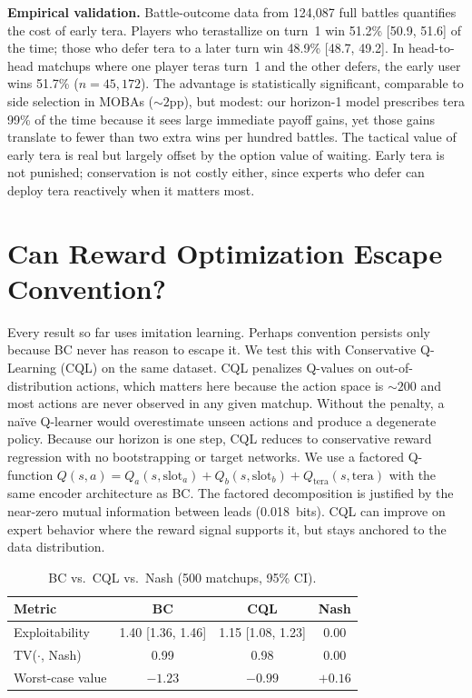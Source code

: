 \documentclass{article}
\begin{document}
\textbf{Empirical validation.} Battle-outcome data from 124,087 full battles quantifies the cost of early tera. Players who terastallize on turn~1 win 51.2\% [50.9, 51.6] of the time; those who defer tera to a later turn win 48.9\% [48.7, 49.2]. In head-to-head matchups where one player teras turn~1 and the other defers, the early user wins 51.7\% ($n = 45{,}172$). The advantage is statistically significant, comparable to side selection in MOBAs (${\sim}2$pp), but modest: our horizon-1 model prescribes tera 99\% of the time because it sees large immediate payoff gains, yet those gains translate to fewer than two extra wins per hundred battles. The tactical value of early tera is real but largely offset by the option value of waiting. Early tera is not punished; conservation is not costly either, since experts who defer can deploy tera reactively when it matters most.

\section{Can Reward Optimization Escape Convention?}
\label{sec:cql}

Every result so far uses imitation learning. Perhaps convention persists only because BC never has reason to escape it. We test this with Conservative Q-Learning (CQL) \citep{kumar2020conservative} on the same dataset. CQL penalizes Q-values on out-of-distribution actions, which matters here because the action space is ${\sim}200$ and most actions are never observed in any given matchup. Without the penalty, a na\"ive Q-learner would overestimate unseen actions and produce a degenerate policy. Because our horizon is one step, CQL reduces to conservative reward regression with no bootstrapping or target networks. We use a factored Q-function $Q(s,a) = Q_a(s,\text{slot}_a) + Q_b(s,\text{slot}_b) + Q_\text{tera}(s,\text{tera})$ with the same encoder architecture as BC. The factored decomposition is justified by the near-zero mutual information between leads (0.018~bits). CQL can improve on expert behavior where the reward signal supports it, but stays anchored to the data distribution.

\begin{table}[t]
\caption{BC vs.\ CQL vs.\ Nash (500 matchups, 95\% CI).}
\label{tab:cql}
\vskip 0.1in
\centering
\small
\begin{tabular}{lccc}
\toprule
Metric & BC & CQL & Nash \\
\midrule
Exploitability & 1.40 [1.36, 1.46] & 1.15 [1.08, 1.23] & 0.00 \\
TV($\cdot$, Nash) & 0.99 & 0.98 & 0.00 \\
Worst-case value & $-1.23$ & $-0.99$ & $+0.16$ \\
\bottomrule
\end{tabular}
\vskip -0.1in
\end{table}
\end{document}
